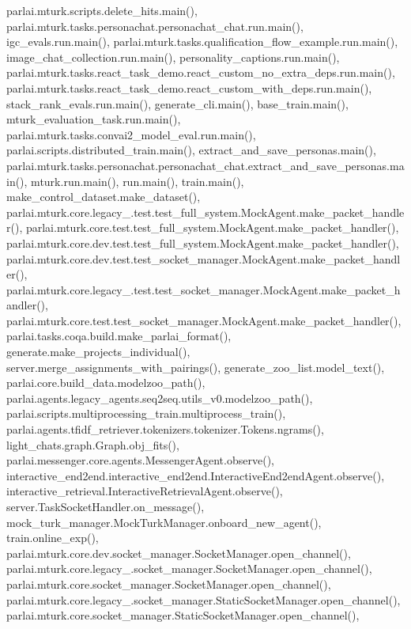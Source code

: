 parlai.\+mturk.\+scripts.\+delete\+\_\+hits.\+main(), parlai.\+mturk.\+tasks.\+personachat.\+personachat\+\_\+chat.\+run.\+main(), igc\+\_\+evals.\+run.\+main(), parlai.\+mturk.\+tasks.\+qualification\+\_\+flow\+\_\+example.\+run.\+main(), image\+\_\+chat\+\_\+collection.\+run.\+main(), personality\+\_\+captions.\+run.\+main(), parlai.\+mturk.\+tasks.\+react\+\_\+task\+\_\+demo.\+react\+\_\+custom\+\_\+no\+\_\+extra\+\_\+deps.\+run.\+main(), parlai.\+mturk.\+tasks.\+react\+\_\+task\+\_\+demo.\+react\+\_\+custom\+\_\+with\+\_\+deps.\+run.\+main(), stack\+\_\+rank\+\_\+evals.\+run.\+main(), generate\+\_\+cli.\+main(), base\+\_\+train.\+main(), mturk\+\_\+evaluation\+\_\+task.\+run.\+main(), parlai.\+mturk.\+tasks.\+convai2\+\_\+model\+\_\+eval.\+run.\+main(), parlai.\+scripts.\+distributed\+\_\+train.\+main(), extract\+\_\+and\+\_\+save\+\_\+personas.\+main(), parlai.\+mturk.\+tasks.\+personachat.\+personachat\+\_\+chat.\+extract\+\_\+and\+\_\+save\+\_\+personas.\+main(), mturk.\+run.\+main(), run.\+main(), train.\+main(), make\+\_\+control\+\_\+dataset.\+make\+\_\+dataset(), parlai.\+mturk.\+core.\+legacy\+\_.\+test.\+test\+\_\+full\+\_\+system.\+Mock\+Agent.\+make\+\_\+packet\+\_\+handler(), parlai.\+mturk.\+core.\+test.\+test\+\_\+full\+\_\+system.\+Mock\+Agent.\+make\+\_\+packet\+\_\+handler(), parlai.\+mturk.\+core.\+dev.\+test.\+test\+\_\+full\+\_\+system.\+Mock\+Agent.\+make\+\_\+packet\+\_\+handler(), parlai.\+mturk.\+core.\+dev.\+test.\+test\+\_\+socket\+\_\+manager.\+Mock\+Agent.\+make\+\_\+packet\+\_\+handler(), parlai.\+mturk.\+core.\+legacy\+\_.\+test.\+test\+\_\+socket\+\_\+manager.\+Mock\+Agent.\+make\+\_\+packet\+\_\+handler(), parlai.\+mturk.\+core.\+test.\+test\+\_\+socket\+\_\+manager.\+Mock\+Agent.\+make\+\_\+packet\+\_\+handler(), parlai.\+tasks.\+coqa.\+build.\+make\+\_\+parlai\+\_\+format(), generate.\+make\+\_\+projects\+\_\+individual(), server.\+merge\+\_\+assignments\+\_\+with\+\_\+pairings(), generate\+\_\+zoo\+\_\+list.\+model\+\_\+text(), parlai.\+core.\+build\+\_\+data.\+modelzoo\+\_\+path(), parlai.\+agents.\+legacy\+\_\+agents.\+seq2seq.\+utils\+\_\+v0.\+modelzoo\+\_\+path(), parlai.\+scripts.\+multiprocessing\+\_\+train.\+multiprocess\+\_\+train(), parlai.\+agents.\+tfidf\+\_\+retriever.\+tokenizers.\+tokenizer.\+Tokens.\+ngrams(), light\+\_\+chats.\+graph.\+Graph.\+obj\+\_\+fits(), parlai.\+messenger.\+core.\+agents.\+Messenger\+Agent.\+observe(), interactive\+\_\+end2end.\+interactive\+\_\+end2end.\+Interactive\+End2end\+Agent.\+observe(), interactive\+\_\+retrieval.\+Interactive\+Retrieval\+Agent.\+observe(), server.\+Task\+Socket\+Handler.\+on\+\_\+message(), mock\+\_\+turk\+\_\+manager.\+Mock\+Turk\+Manager.\+onboard\+\_\+new\+\_\+agent(), train.\+online\+\_\+exp(), parlai.\+mturk.\+core.\+dev.\+socket\+\_\+manager.\+Socket\+Manager.\+open\+\_\+channel(), parlai.\+mturk.\+core.\+legacy\+\_.\+socket\+\_\+manager.\+Socket\+Manager.\+open\+\_\+channel(), parlai.\+mturk.\+core.\+socket\+\_\+manager.\+Socket\+Manager.\+open\+\_\+channel(), parlai.\+mturk.\+core.\+legacy\+\_.\+socket\+\_\+manager.\+Static\+Socket\+Manager.\+open\+\_\+channel(), parlai.\+mturk.\+core.\+socket\+\_\+manager.\+Static\+Socket\+Manager.\+open\+\_\+channel(), 